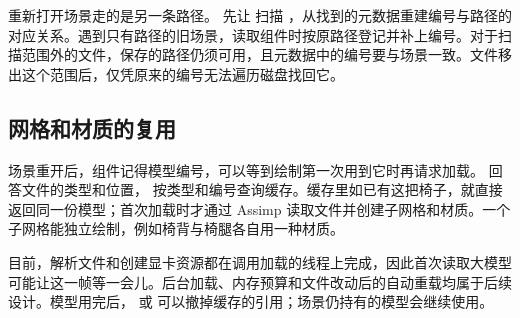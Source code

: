 重新打开场景走的是另一条路径。 先让  扫描 ，从找到的元数据重建编号与路径的对应关系。遇到只有路径的旧场景，读取组件时按原路径登记并补上编号。对于扫描范围外的文件，保存的路径仍须可用，且元数据中的编号要与场景一致。文件移出这个范围后，仅凭原来的编号无法遍历磁盘找回它。

\subsection{网格和材质的复用}
场景重开后，组件记得模型编号，可以等到绘制第一次用到它时再请求加载。 回答文件的类型和位置， 按类型和编号查询缓存。缓存里如已有这把椅子，就直接返回同一份模型；首次加载时才通过 Assimp 读取文件并创建子网格和材质。一个子网格能独立绘制，例如椅背与椅腿各自用一种材质。

目前，解析文件和创建显卡资源都在调用加载的线程上完成，因此首次读取大模型可能让这一帧等一会儿。后台加载、内存预算和文件改动后的自动重载均属于后续设计。模型用完后， 或  可以撤掉缓存的引用；场景仍持有的模型会继续使用。

